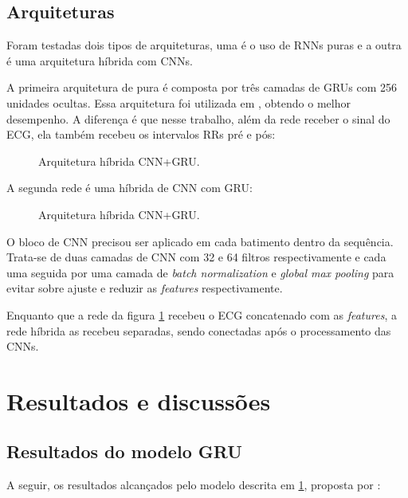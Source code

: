 \documentclass[
    12pt,                %
    openright,           %
    oneside,             %
    a4paper,             %
    brazil               %
]{abntex2}
\begin{document}
\section{Arquiteturas}
\label{sec:modelos}

Foram testadas dois tipos de arquiteturas, uma é o uso de RNNs puras e a outra é uma arquitetura híbrida com CNNs. 

A primeira arquitetura de pura é composta por três camadas de GRUs com 256 unidades ocultas. Essa arquitetura foi utilizada em , obtendo o melhor desempenho. 
A diferença é que nesse trabalho, além da rede receber o sinal do ECG, ela também recebeu os intervalos RRs pré e pós:


\begin{figure}[H]
  \centering
  \caption{Arquitetura híbrida CNN+GRU.}
  \label{fig:gru_pura}
\end{figure}

A segunda rede é uma híbrida de CNN com GRU:

\begin{figure}[H]
  \centering
  \caption{Arquitetura híbrida CNN+GRU.}
  \label{fig:cnn_gru}
\end{figure}

O bloco de CNN precisou ser aplicado em cada batimento dentro da sequência. Trata-se de duas camadas de CNN com 32 e 64 filtros respectivamente e cada 
uma seguida por uma camada de \textit{batch normalization} e \textit{global max pooling} para evitar sobre ajuste e reduzir as \textit{features} respectivamente.

Enquanto que a rede da figura \ref{fig:gru_pura} recebeu o ECG concatenado com as \textit{features}, a rede híbrida as recebeu separadas, sendo conectadas após o processamento
das CNNs.

\chapter{Resultados e discussões}

\section{Resultados do modelo GRU}

A seguir, os resultados alcançados pelo modelo descrita em \ref{fig:gru_pura}, proposta por \cite{narotamo2024}:
\end{document}

